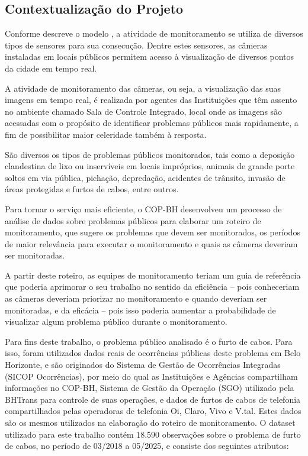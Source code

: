 \subsection{Contextualização do Projeto}

Conforme descreve o modelo \cite{ModeloGestaoCOP}, a atividade de monitoramento se utiliza de diversos tipos de sensores para sua consecução. Dentre estes sensores, as câmeras instaladas em locais públicos permitem acesso à visualização de diversos pontos da cidade em tempo real.

A atividade de monitoramento das câmeras, ou seja, a visualização das suas imagens em tempo real, é realizada por agentes das Instituições que têm assento no ambiente chamado Sala de Controle Integrado, local onde as imagens são acessadas com o propósito de identificar problemas públicos mais rapidamente, a fim de possibilitar maior celeridade também à resposta.

São diversos os tipos de problemas públicos monitorados, tais como a deposição clandestina de lixo ou inservíveis em locais impróprios, animais de grande porte soltos em via pública, pichação, depredação, acidentes de trânsito, invasão de áreas protegidas e furtos de cabos, entre outros.

Para tornar o serviço mais eficiente, o COP-BH desenvolveu um processo de análise de dados sobre problemas públicos para elaborar um roteiro de monitoramento, que sugere os problemas que devem ser monitorados, os períodos de maior relevância para executar o monitoramento e quais as câmeras deveriam ser monitoradas.

A partir deste roteiro, as equipes de monitoramento teriam um guia de referência que poderia aprimorar o seu trabalho no sentido da eficiência -- pois conheceriam as câmeras deveriam priorizar no monitoramento e quando deveriam ser monitoradas, e da eficácia -- pois isso poderia aumentar a probabilidade de visualizar algum problema público durante o monitoramento.

Para fins deste trabalho, o problema público analisado é o furto de cabos. Para isso, foram utilizados dados reais de ocorrências públicas deste problema em Belo Horizonte, e são originados do Sistema de Gestão de Ocorrências Integradas (SICOP Ocorrências), por meio do qual as Instituições e Agências compartilham informações no COP-BH, Sistema de Gestão da Operação (SGO) utilizado pela BHTrans para controle de suas operações, e dados de furtos de cabos de telefonia compartilhados pelas operadoras de telefonia Oi, Claro, Vivo e V.tal. Estes dados são os mesmos utilizados na elaboração do roteiro de monitoramento. O dataset utilizado para este trabalho contém 18.590 observações sobre o problema de furto de cabos, no período de 03/2018 a 05/2025, e consiste dos seguintes atributos:

